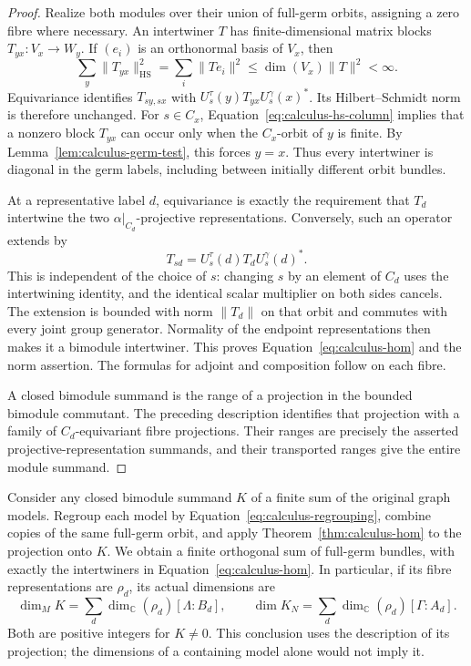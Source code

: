 \begin{proof}
Realize both modules over their union of full-germ orbits, assigning a
zero fibre where necessary.  An intertwiner $T$ has finite-dimensional
matrix blocks $T_{yx}:V_x\to W_y$.  If $(e_i)$ is an orthonormal basis
of $V_x$, then
\begin{equation}\label{eq:calculus-hs-column}
 \sum_y\|T_{yx}\|_{\mathrm{HS}}^2
 =\sum_i\|Te_i\|^2
 \leq\dim(V_x)\|T\|^2<\infty.
\end{equation}
Equivariance identifies $T_{sy,sx}$ with
$U^\tau_s(y)T_{yx}U^\gamma_s(x)^*$.  Its Hilbert--Schmidt norm is
therefore unchanged.  For $s\in C_x$, Equation~\eqref{eq:calculus-hs-column}
implies that a nonzero block $T_{yx}$ can occur only when the
$C_x$-orbit of $y$ is finite.  By
Lemma~\ref{lem:calculus-germ-test}, this forces $y=x$.
Thus every intertwiner is diagonal in the germ labels, including
between initially different orbit bundles.

At a representative label $d$, equivariance is exactly the requirement
that $T_d$ intertwine the two $\alpha|_{C_d}$-projective
representations.  Conversely, such an operator extends by
\[
 T_{sd}=U^\tau_s(d)T_dU^\gamma_s(d)^*.
\]
This is independent of the choice of $s$: changing $s$ by an element
of $C_d$ uses the intertwining identity, and the identical scalar
multiplier on both sides cancels.  The extension is bounded with norm
$\|T_d\|$ on that orbit and commutes with every joint group generator.
Normality of the endpoint representations then makes it a bimodule
intertwiner.  This proves Equation~\eqref{eq:calculus-hom} and the
norm assertion.  The formulas for adjoint and composition follow
on each fibre.

A closed bimodule summand is the range of a projection in the bounded
bimodule commutant.  The preceding description identifies that
projection with a family of $C_d$-equivariant fibre projections.
Their ranges are precisely the asserted projective-representation
summands, and their transported ranges give the entire module summand.
\end{proof}

Consider any closed bimodule summand $K$ of a finite sum of the original
graph models. Regroup each model by Equation~\eqref{eq:calculus-regrouping},
combine copies of the same full-germ orbit, and apply
Theorem~\ref{thm:calculus-hom} to the projection onto $K$.  We obtain a finite
orthogonal sum of full-germ bundles, with exactly the intertwiners
in Equation~\eqref{eq:calculus-hom}.  In particular, if its fibre
representations are $\rho_d$, its actual dimensions are
\begin{equation}\label{eq:calculus-summand-dimensions}
 \dim_M K=\sum_d\dim_{\mathbb C}(\rho_d)[\Lambda:B_d],
 \qquad
 \dim K_N=\sum_d\dim_{\mathbb C}(\rho_d)[\Gamma:A_d].
\end{equation}
Both are positive integers for $K\ne0$.  This conclusion uses the
description of its projection; the dimensions of a containing model
alone would not imply it.

